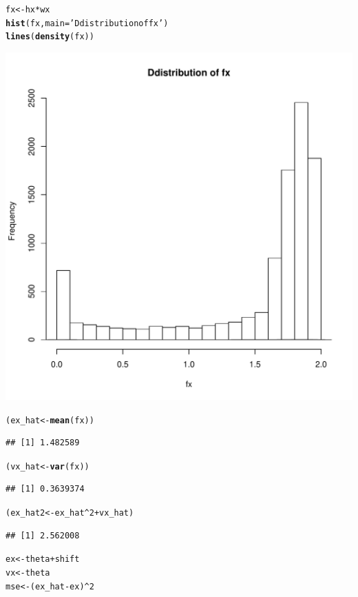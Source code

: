 \documentclass{article}\usepackage[]{graphicx}\usepackage[]{color}
\makeatletter
\def\maxwidth{ %
  \ifdim\Gin@nat@width>\linewidth
    \linewidth
  \else
    \Gin@nat@width
  \fi
}
\newcommand{\hlnum}[1]{\textcolor[rgb]{0.686,0.059,0.569}{#1}}%
\newcommand{\hlstr}[1]{\textcolor[rgb]{0.192,0.494,0.8}{#1}}%
\newcommand{\hlopt}[1]{\textcolor[rgb]{0,0,0}{#1}}%
\newcommand{\hlstd}[1]{\textcolor[rgb]{0.345,0.345,0.345}{#1}}%
\newcommand{\hlkwb}[1]{\textcolor[rgb]{0.69,0.353,0.396}{#1}}%
\newcommand{\hlkwc}[1]{\textcolor[rgb]{0.333,0.667,0.333}{#1}}%
\newcommand{\hlkwd}[1]{\textcolor[rgb]{0.737,0.353,0.396}{\textbf{#1}}}%
\newenvironment{kframe}{%
 \def\at@end@of@kframe{}%
 \ifinner\ifhmode%
  \def\at@end@of@kframe{\end{minipage}}%
  \begin{minipage}{\columnwidth}%
 \fi\fi%
 \def\FrameCommand##1{\hskip\@totalleftmargin \hskip-\fboxsep
 \colorbox{shadecolor}{##1}\hskip-\fboxsep
     \hskip-\linewidth \hskip-\@totalleftmargin \hskip\columnwidth}%
 \MakeFramed {\advance\hsize-\width
   \@totalleftmargin\z@ \linewidth\hsize
   \@setminipage}}%
 {\par\unskip\endMakeFramed%
 \at@end@of@kframe}
\newenvironment{knitrout}{}{} %
\makeatother
\begin{document}
\begin{knitrout}
\begin{kframe}\begin{alltt}
\hlstd{fx} \hlkwb{<-} \hlstd{hx} \hlopt{*} \hlstd{wx}
\hlkwd{hist}\hlstd{(fx,}\hlkwc{main}\hlstd{=}\hlstr{'Ddistribution of fx'}\hlstd{)}
\hlkwd{lines}\hlstd{(}\hlkwd{density}\hlstd{(fx))}
\end{alltt}
\end{kframe}
\includegraphics[width=\maxwidth]{figure/unnamed-chunk-2-2} 
\begin{kframe}\begin{alltt}
\hlstd{(ex_hat} \hlkwb{<-} \hlkwd{mean}\hlstd{(fx))}
\end{alltt}
\begin{verbatim}
## [1] 1.482589
\end{verbatim}
\begin{alltt}
\hlstd{(vx_hat} \hlkwb{<-} \hlkwd{var}\hlstd{(fx))}
\end{alltt}
\begin{verbatim}
## [1] 0.3639374
\end{verbatim}
\begin{alltt}
\hlstd{(ex_hat2} \hlkwb{<-} \hlstd{ex_hat}\hlopt{^}\hlnum{2}\hlopt{+}\hlstd{vx_hat)}
\end{alltt}
\begin{verbatim}
## [1] 2.562008
\end{verbatim}
\begin{alltt}
\hlstd{ex} \hlkwb{<-} \hlstd{theta} \hlopt{+} \hlstd{shift}
\hlstd{vx} \hlkwb{<-} \hlstd{theta}
\hlstd{mse} \hlkwb{<-} \hlstd{(ex_hat}\hlopt{-}\hlstd{ex)}\hlopt{^}\hlnum{2}
\end{alltt}
\end{kframe}
\end{knitrout}
\end{document}
